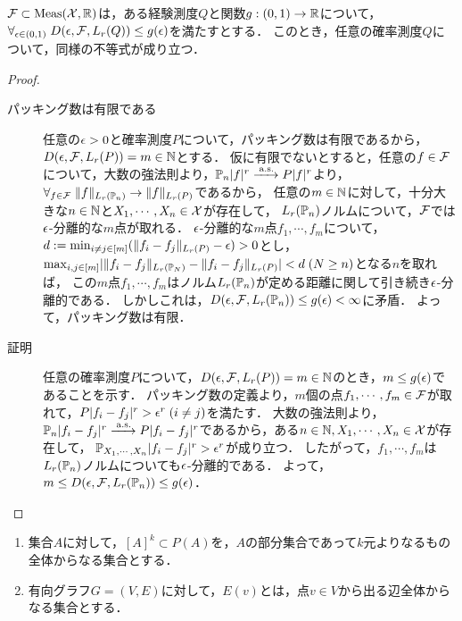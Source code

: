 \documentclass[uplatex,dvipdfmx]{jsreport}
\begin{document}
\begin{lemma}
    $\mathcal{F}\subset\mathrm{Meas}(\mathcal{X},\mathbb{R})$は，ある経験測度$Q$と関数$g:(0,1)\to\mathbb{R}$について，$\forall_{\epsilon\in(0,1)}\;D(\epsilon,\mathcal{F},L_r(Q))\le g(\epsilon)$を満たすとする．
    このとき，任意の確率測度$Q$について，同様の不等式が成り立つ．
\end{lemma}
\begin{proof}\mbox{}
    \begin{description}
        \item[パッキング数は有限である] 任意の$\epsilon>0$と確率測度$P$について，パッキング数は有限であるから，$D(\epsilon,\mathcal{F},L_r(P))=m\in\mathbb{N}$とする．
        仮に有限でないとすると，任意の$f\in\mathcal{F}$について，大数の強法則より，$\mathbb{P}_n\lvert f\rvert^r\xrightarrow{\;\mathrm{a.s.}}P\lvert f\rvert^r$より，$\forall_{f\in\mathcal{F}}\;\|f\|_{L_r(\mathbb{P}_n)}\to\|f\|_{L_r(P)}$であるから，
        任意の$m\in\mathbb{N}$に対して，十分大きな$n\in\mathbb{N}$と$X_1,\cdots,X_n\in\mathcal{X}$が存在して，
        $L_r(\mathbb{P}_n)$ノルムについて，$\mathcal{F}$では$\epsilon$-分離的な$m$点が取れる．
        $\epsilon$-分離的な$m$点$f_1,\cdots,f_m$について，
        $d:=\min_{i\ne j\in[m]}(\|f_i-f_j\|_{L_r(P)}-\epsilon)>0$とし，$\max_{i,j\in[m]}\lvert\|f_i-f_j\|_{L_r(\mathbb{P}_N)}-\|f_i-f_j\|_{L_r(P)}\rvert<d\;(N\ge n)$となる$n$を取れば，
        この$m$点$f_1,\cdots,f_m$はノルム$L_r(\mathbb{P}_n)$が定める距離に関して引き続き$\epsilon$-分離的である．
        しかしこれは，$D(\epsilon,\mathcal{F},L_r(\mathbb{P}_n))\le g(\epsilon)<\infty$に矛盾．
        よって，パッキング数は有限．
        \item[証明] 任意の確率測度$P$について，$D(\epsilon,\mathcal{F},L_r(P))=m\in\mathbb{N}$のとき，$m\le g(\epsilon)$であることを示す．
        パッキング数の定義より，$m$個の点$f_1,\cdots,f_m\in\mathcal{F}$が取れて，$P\lvert f_i-f_j\rvert^r>\epsilon^r\;(i\ne j)$を満たす．
        大数の強法則より，$\mathbb{P}_n\lvert f_i-f_j\rvert^r\xrightarrow{\;\mathrm{a.s.}}P\lvert f_i-f_j\rvert^r$であるから，ある$n\in\mathbb{N},X_1,\cdots,X_n\in\mathcal{X}$が存在して，
        $\mathbb{P}_{X_1,\cdots,X_n}\lvert f_i-f_j\rvert^r>\epsilon^r$が成り立つ．
        したがって，$f_1,\cdots,f_m$は$L_r(\mathbb{P}_n)$ノルムについても$\epsilon$-分離的である．
        よって，$m\le D(\epsilon,\mathcal{F},L_r(\mathbb{P}_n))\le g(\epsilon)$．
    \end{description}
\end{proof}

\begin{notation}[グラフ]\mbox{}
    \begin{enumerate}
        \item 集合$A$に対して，$[A]^k\subset P(A)$を，$A$の部分集合であって$k$元よりなるもの全体からなる集合とする．
        \item 有向グラフ$G=(V,E)$に対して，$E(v)$とは，点$v\in V$から出る辺全体からなる集合とする．
    \end{enumerate}
\end{notation}
\end{document}
